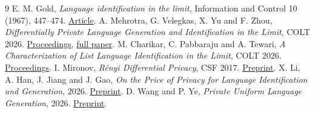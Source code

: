 \documentclass[11pt]{article}
\begin{document}
\begin{thebibliography}{9}
 E. M. Gold, \emph{Language identification in the limit}, Information and Control 10 (1967), 447--474. \href{https://doi.org/10.1016/S0019-9958(67)91165-5}{Article}.
 A. Mehrotra, G. Velegkas, X. Yu and F. Zhou, \emph{Differentially Private Language Generation and Identification in the Limit}, COLT 2026. \href{https://proceedings.mlr.press/v336/mehrotra26b.html}{Proceedings}, \href{https://arxiv.org/abs/2604.08504}{full paper}.
 M. Charikar, C. Pabbaraju and A. Tewari, \emph{A Characterization of List Language Identification in the Limit}, COLT 2026. \href{https://proceedings.mlr.press/v336/charikar26a.html}{Proceedings}.
 I. Mironov, \emph{R\'enyi Differential Privacy}, CSF 2017. \href{https://arxiv.org/abs/1702.07476}{Preprint}.
 X. Li, A. Han, J. Jiang and J. Gao, \emph{On the Price of Privacy for Language Identification and Generation}, 2026. \href{https://arxiv.org/abs/2604.07238}{Preprint}.
 D. Wang and P. Ye, \emph{Private Uniform Language Generation}, 2026. \href{https://arxiv.org/abs/2611.00797}{Preprint}.
\end{thebibliography}
\end{document}

